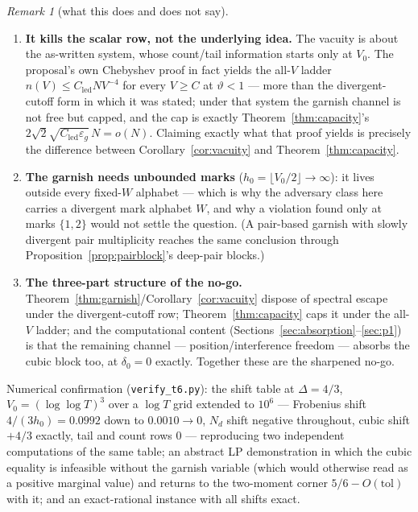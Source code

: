 \documentclass[11pt]{article}
\theoremstyle{plain}
\theoremstyle{definition}
\theoremstyle{remark}
\newtheorem{remark}[theorem]{Remark}
\newcommand{\Cled}{C_{\mathrm{led}}}
\newcommand{\Nd}{N_{d}}
\begin{document}
\begin{remark}[what this does and does not say]
\label{rem:scope}
\begin{enumerate}
\item \textbf{It kills the scalar row, not the underlying idea.} The vacuity is
  about the as-written system, whose count/tail information starts only at
  $V_0$. The proposal's own Chebyshev proof in fact yields the all-$V$ ladder
  $n(V) \le \Cled N V^{-4}$ for every $V \ge C$ at $\vartheta < 1$ --- more than
  the divergent-cutoff form in which it was stated; under that system the
  garnish channel is not free but capped, and the cap is exactly
  Theorem~\ref{thm:capacity}'s $2\sqrt{2}\sqrt{\Cled \varepsilon_g}\, N = o(N)$.
  Claiming exactly what that proof yields is precisely the difference between
  Corollary~\ref{cor:vacuity} and Theorem~\ref{thm:capacity}.
\item \textbf{The garnish needs unbounded marks}
  ($h_0 = \lfloor V_0/2 \rfloor \to \infty$): it lives outside every fixed-$W$
  alphabet --- which is why the adversary class here carries a divergent mark
  alphabet $W$, and why a violation found only at marks $\{1, 2\}$ would not
  settle the question. (A pair-based
  garnish with slowly divergent pair multiplicity reaches the same conclusion
  through Proposition~\ref{prop:pairblock}'s deep-pair blocks.)
\item \textbf{The three-part structure of the no-go.}
  Theorem~\ref{thm:garnish}/Corollary~\ref{cor:vacuity} dispose of spectral
  escape under the divergent-cutoff row; Theorem~\ref{thm:capacity} caps it
  under the all-$V$ ladder; and the
  computational content (Sections~\ref{sec:absorption}--\ref{sec:p1}) is that
  the remaining channel --- position/interference freedom --- absorbs the cubic
  block too, at $\delta_0 = 0$ exactly. Together these are the sharpened no-go.
\end{enumerate}
\end{remark}

Numerical confirmation (\texttt{verify\_t6.py}): the shift table at
$\Delta = 4/3$, $V_0 = (\log\log T)^3$ over a $\log T$ grid
extended to $10^6$ --- Frobenius shift $4/(3 h_0) = 0.0992$ down to
$0.0010 \to 0$, $\Nd$ shift negative throughout, cubic shift $+4/3$ exactly, tail
and count rows $0$ --- reproducing two independent computations of the same
table; an abstract LP demonstration in which the cubic equality is infeasible
without the garnish variable (which would otherwise read as a positive marginal
value) and returns to the two-moment corner $5/6 - O(\mathrm{tol})$ with it; and
an exact-rational instance with all shifts exact.
\end{document}
